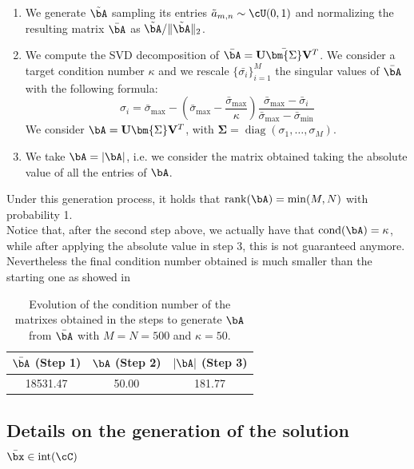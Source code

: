 \documentclass[11pt]{amsart}
\begin{document}
\begin{enumerate}
    \item We generate $\tilde{\bA}$ sampling its entries $\tilde{a}_{m,n} \sim \cU(0,1)$ and normalizing the resulting matrix $\bar{\bA}$ as $\tilde{\bA} / \|\tilde{\bA}\|_2$.
    \item We compute the SVD decomposition of $\bar{\bA} = \mathbf{U} \bar{\bm{\Sigma}} \mathbf{V}^{T}$. We consider a target condition number $\kappa$  and we rescale $\{\bar{\sigma_i}\}_{i=1}^M$ the singular values of $\bar{\bA}$ with the following formula:
$$
        \sigma_{i} = \bar{\sigma}_{\max} - \left(\bar{\sigma}_{\max} - \frac{\bar{\sigma}_{\max}}{\kappa}\right) \frac{\bar{\sigma}_{\max}- \bar{\sigma}_i}{\bar{\sigma}_{\max}- \bar{\sigma}_{\min}}
$$
    We consider $\bA = \mathbf{U} \bm{\Sigma} \mathbf{V}^{T}$, with $\bm{\Sigma} = \operatorname{diag}(\sigma_1,\dots,\sigma_M)$.
    \item We take $\bA = |\bA|$, i.e. we consider the matrix obtained taking the absolute value of all the entries of $\bA$. 
\end{enumerate}
 Under this generation process, it holds that $\operatorname{rank}(\bA) = \min(M,N)$ with probability 1.\\

Notice that, after the second step above, we actually have that $\operatorname{cond}(\bA) = \kappa$, while after applying the absolute value in step 3, this is not guaranteed anymore. Nevertheless the final condition number obtained is much smaller than the starting one as showed in 

\begin{table}[h]
\setlength{\extrarowheight}{0.1cm}
\centering
\caption{Evolution of the condition number of the matrixes obtained in the steps to generate $\bA$ from $\bar{\bA}$ with $M=N=500$ and $\kappa=50$.}
\label{tab:cond_number_evolution}
\begin{tabular}{ccc}
\hline
 $\bar{\bA}$ (Step 1) &  $\bA$ (Step 2) & {$|\bA|$} (Step 3) \\ \hline
18531.47                  & 50.00                       & 181.77                                \\ \hline
\end{tabular}
\end{table}


\subsection{\texorpdfstring{Details on the generation of the solution $\bar{\bx} \in \operatorname{int}(\cC)$}{Details on the generation of the solution x }} \label{app: construction of bar x in int C}
\end{document}
